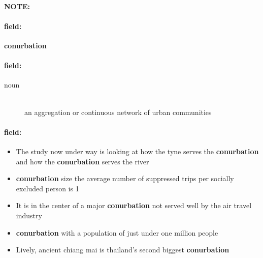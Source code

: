 \documentclass[12pt]{article}
\newenvironment{note}{\paragraph{NOTE:}}{}
\newenvironment{field}{\paragraph{field:}}{}
\begin{document}
\begin{note}
\begin{field}
\textbf{\large conurbation}
\end{field}


\begin{field}
\begin{description}
\item[noun] \hfill \\ 
an aggregation or continuous network of urban communities

\end{description}
\end{field}

\begin{field}
\begin{itemize}
\item The study now under way is looking at how the tyne serves the \textbf{conurbation} and how the \textbf{conurbation} serves the river
\item \textbf{conurbation} size the average number of suppressed trips per socially excluded person is 1
\item It is in the center of a major \textbf{conurbation} not served well by the air travel industry
\item \textbf{conurbation} with a population of just under one million people
\item Lively, ancient chiang mai is thailand's second biggest \textbf{conurbation}
\end{itemize}
\end{field}
\end{note}
\end{document}
